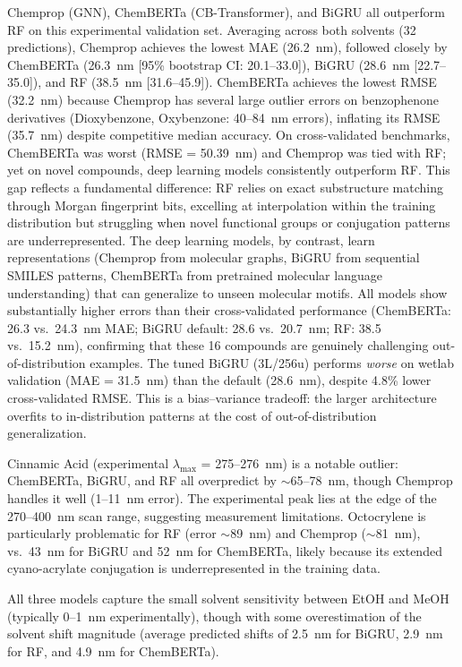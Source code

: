\documentclass[11pt,a4paper]{article}
\begin{document}
Chemprop (GNN), ChemBERTa (CB-Transformer), and BiGRU all outperform RF on this experimental validation set. Averaging across both solvents (32 predictions), Chemprop achieves the lowest MAE (26.2~nm), followed closely by ChemBERTa (26.3~nm [95\% bootstrap CI: 20.1--33.0]), BiGRU (28.6~nm [22.7--35.0]), and RF (38.5~nm [31.6--45.9]).
ChemBERTa achieves the lowest RMSE (32.2~nm) because Chemprop has several large outlier errors on benzophenone derivatives (Dioxybenzone, Oxybenzone: 40--84~nm errors), inflating its RMSE (35.7~nm) despite competitive median accuracy.
On cross-validated benchmarks, ChemBERTa was worst (RMSE = 50.39~nm) and Chemprop was tied with RF; yet on novel compounds, deep learning models consistently outperform RF.
This gap reflects a fundamental difference: RF relies on exact substructure matching through Morgan fingerprint bits, excelling at interpolation within the training distribution but struggling when novel functional groups or conjugation patterns are underrepresented.
The deep learning models, by contrast, learn representations (Chemprop from molecular graphs, BiGRU from sequential SMILES patterns, ChemBERTa from pretrained molecular language understanding) that can generalize to unseen molecular motifs.
All models show substantially higher errors than their cross-validated performance (ChemBERTa: 26.3 vs.\ 24.3~nm MAE; BiGRU default: 28.6 vs.\ 20.7~nm; RF: 38.5 vs.\ 15.2~nm), confirming that these 16 compounds are genuinely challenging out-of-distribution examples.
The tuned BiGRU (3L/256u) performs \textit{worse} on wetlab validation (MAE = 31.5~nm) than the default (28.6~nm), despite 4.8\% lower cross-validated RMSE. This is a bias--variance tradeoff: the larger architecture overfits to in-distribution patterns at the cost of out-of-distribution generalization.

Cinnamic Acid (experimental $\lambda_{\max}$ = 275--276~nm) is a notable outlier: ChemBERTa, BiGRU, and RF all overpredict by $\sim$65--78~nm, though Chemprop handles it well (1--11~nm error).
The experimental peak lies at the edge of the 270--400~nm scan range, suggesting measurement limitations.
Octocrylene is particularly problematic for RF (error $\sim$89~nm) and Chemprop ($\sim$81~nm), vs.\ 43~nm for BiGRU and 52~nm for ChemBERTa, likely because its extended cyano-acrylate conjugation is underrepresented in the training data.

All three models capture the small solvent sensitivity between EtOH and MeOH (typically 0--1~nm experimentally), though with some overestimation of the solvent shift magnitude (average predicted shifts of 2.5~nm for BiGRU, 2.9~nm for RF, and 4.9~nm for ChemBERTa).
\end{document}
